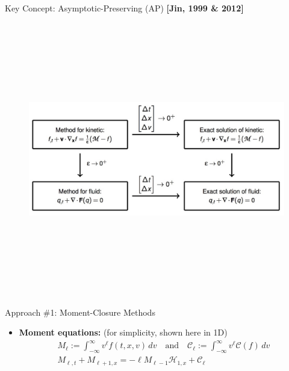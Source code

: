 \documentclass[final,hyperref={pdfpagelabels=false}]{beamer}
\begin{document}
\begin{frame}[t]
\begin{columns}[t]
\begin{column}{.31\textwidth}
\begin{block}{Key Concept: Asymptotic-Preserving (AP) {\bf [Jin, 1999 \& 2012]}
}
\begin{figure}
\begin{center}
   \includegraphics[height=120mm]{APdiagram.jpg}
   \end{center}
\end{figure}


     
\end{block}

\begin{block}{Approach \#1: Moment-Closure Methods}


\begin{itemize}

\item{\bf Moment equations:} (for simplicity, shown here in 1D)
\begin{gather*}
  M_{\ell} := \int_{-\infty}^{\infty} v^\ell f(t,x,v) \, dv \quad \text{and} \quad
  {\mathcal C}_{\ell} := \int_{-\infty}^{\infty} v^\ell {\mathcal C}(f) \, dv \\
  M_{\ell,t} + M_{\ell+1,x} = -\ell M_{\ell-1} {\mathcal H}_{1,x} + {\mathcal C}_{\ell}
\end{gather*}


\end{itemize}
\end{block}
\end{column}
\end{columns}
\end{frame}
\end{document}
